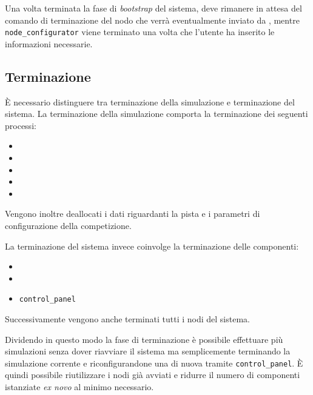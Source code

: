 Una volta terminata la fase di \textit{bootstrap} del sistema, \nodeman{} deve rimanere in attesa del comando di terminazione del nodo che verrà eventualmente inviato da \bootserv{}, mentre \texttt{node\_configurator} viene terminato una volta che l'utente ha inserito le informazioni necessarie.

\subsection*{Terminazione}
\`E necessario distinguere tra terminazione della simulazione e terminazione del sistema.
La terminazione della simulazione comporta la terminazione dei seguenti processi:
\begin{itemize}
\item \sched{}
\item \evdisp{}
\item \team{}
\item \car{}
\item \weather{}
\end{itemize}
Vengono inoltre deallocati i dati riguardanti la pista e i parametri di configurazione della competizione.

La terminazione del sistema invece coinvolge la terminazione delle componenti:
\begin{itemize}
\item \bootserv{}
\item \nodeman{}
\item \texttt{control\_panel}
\end{itemize}
Successivamente vengono anche terminati tutti i nodi del sistema.

Dividendo in questo modo la fase di terminazione è possibile effettuare più simulazioni senza dover riavviare il sistema ma semplicemente terminando la simulazione corrente e riconfigurandone una di nuova tramite \texttt{control\_panel}. \`E quindi possibile riutilizzare i nodi già avviati e ridurre il numero di componenti istanziate \textit{ex novo} al minimo necessario.

